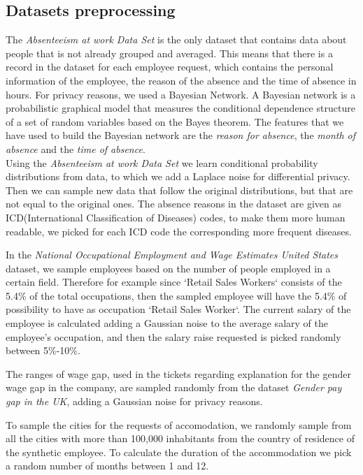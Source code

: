 \documentclass{article}
\begin{document}
\subsection{Datasets preprocessing}
The \textit{Absenteeism at work Data Set} is the only dataset that contains data about people that is not already grouped and averaged. This means that there is a record in the dataset for each employee request, which contains the personal information of the employee, the reason of the absence and the time of absence in hours. For privacy reasons, we used a Bayesian Network. A Bayesian network is a probabilistic graphical model that measures the conditional dependence structure of a set of random variables based on the Bayes theorem. The features that we have used to build the Bayesian network are the \textit{reason for absence}, the \textit{month of absence} and the \textit{time of absence}.
\\
Using the \textit{Absenteeism at work Data Set} we learn conditional probability distributions from data, to which we add a Laplace noise for differential privacy. Then we can sample new data that follow the original distributions, but that are not equal to the original ones. The absence reasons in the dataset are given as ICD(International Classification of Diseases) codes, to make them more human readable, we picked for each ICD code the corresponding more frequent diseases.

In the \textit{National Occupational Employment and Wage Estimates United States} dataset, we sample employees based on the number of people employed in a certain field. Therefore for example since `Retail Sales Workers` consists of the 5.4\% of the total occupations, then the sampled employee will have the 5.4\% of possibility to have as occupation `Retail Sales Worker`.
The current salary of the employee is calculated adding a Gaussian noise to the average salary of the employee's occupation, and then the salary raise requested is picked randomly between 5\%-10\%.

The ranges of wage gap, used in the tickets regarding explanation for the gender wage gap in the company, are sampled randomly from the dataset \textit{Gender pay gap in the UK}, adding a Gaussian noise for privacy reasons.

To sample the cities for the requests of accomodation, we randomly sample from all the cities with more than 100,000 inhabitants from the country of residence of the synthetic employee. To calculate the duration of the accommodation we pick a random number of months between 1 and 12.
\end{document}
